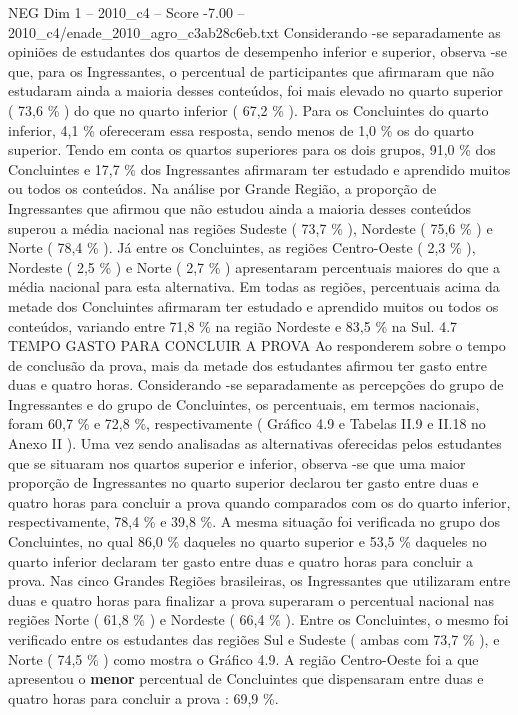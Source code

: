 \begin{textsample}{NEG Dim 1 – 2010\_c4 – Score -7.00 – 2010\_c4/enade\_2010\_agro\_c3ab28c6eb.txt}
Considerando -se separadamente as opiniões de estudantes dos quartos de desempenho inferior e superior, observa -se que, para os Ingressantes, o percentual de participantes que afirmaram que não estudaram ainda a maioria desses conteúdos, foi mais elevado no quarto superior ( 73,6 \% ) do que no quarto inferior ( 67,2 \% ).
Para os Concluintes do quarto inferior, 4,1 \% ofereceram essa resposta, sendo menos de 1,0 \% os do quarto superior.
Tendo em conta os quartos superiores para os dois grupos, 91,0 \% dos Concluintes e 17,7 \% dos Ingressantes afirmaram ter estudado e aprendido muitos ou todos os conteúdos.
Na análise por Grande Região, a proporção de Ingressantes que afirmou que não estudou ainda a maioria desses conteúdos superou a média nacional nas regiões Sudeste ( 73,7 \% ), Nordeste ( 75,6 \% ) e Norte ( 78,4 \% ).
Já entre os Concluintes, as regiões Centro-Oeste ( 2,3 \% ), Nordeste ( 2,5 \% ) e Norte ( 2,7 \% ) apresentaram percentuais maiores do que a média nacional para esta alternativa.
Em todas as regiões, percentuais acima da metade dos Concluintes afirmaram ter estudado e aprendido muitos ou todos os conteúdos, variando entre 71,8 \% na região Nordeste e 83,5 \% na Sul. 4.7 TEMPO GASTO PARA CONCLUIR A PROVA Ao responderem sobre o tempo de conclusão da prova, mais da metade dos estudantes afirmou ter gasto entre duas e quatro horas.
Considerando -se separadamente as percepções do grupo de Ingressantes e do grupo de Concluintes, os percentuais, em termos nacionais, foram 60,7 \% e 72,8 \%, respectivamente ( Gráfico 4.9 e Tabelas II.9 e II.18 no Anexo II ).
Uma vez sendo analisadas as alternativas oferecidas pelos estudantes que se situaram nos quartos superior e inferior, observa -se que uma maior proporção de Ingressantes no quarto superior declarou ter gasto entre duas e quatro horas para concluir a prova quando comparados com os do quarto inferior, respectivamente, 78,4 \% e 39,8 \%.
A mesma situação foi verificada no grupo dos Concluintes, no qual 86,0 \% daqueles no quarto superior e 53,5 \% daqueles no quarto inferior declaram ter gasto entre duas e quatro horas para concluir a prova.
Nas cinco Grandes Regiões brasileiras, os Ingressantes que utilizaram entre duas e quatro horas para finalizar a prova superaram o percentual nacional nas regiões Norte ( 61,8 \% ) e Nordeste ( 66,4 \% ).
Entre os Concluintes, o mesmo foi verificado entre os estudantes das regiões Sul e Sudeste ( ambas com 73,7 \% ), e Norte ( 74,5 \% ) como mostra o Gráfico 4.9.
A região Centro-Oeste foi a que apresentou o \textbf{menor} percentual de Concluintes que dispensaram entre duas e quatro horas para concluir a prova : 69,9 \%.

\end{textsample}
